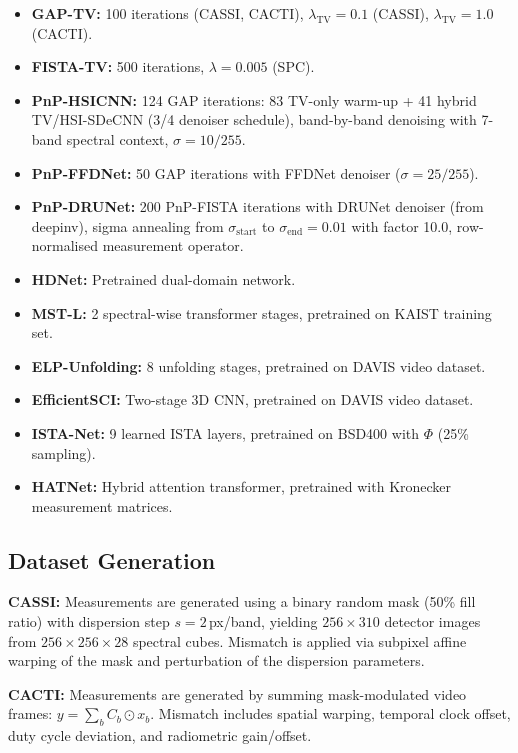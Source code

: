 \documentclass[runningheads]{llncs}
\begin{document}
\begin{itemize}
    \item \textbf{GAP-TV:} 100 iterations (CASSI, CACTI), $\lambda_{\text{TV}} = 0.1$ (CASSI), $\lambda_{\text{TV}} = 1.0$ (CACTI).
    \item \textbf{FISTA-TV:} 500 iterations, $\lambda = 0.005$ (SPC).
    \item \textbf{PnP-HSICNN:} 124 GAP iterations: 83 TV-only warm-up + 41 hybrid TV/HSI-SDeCNN (3/4 denoiser schedule), band-by-band denoising with 7-band spectral context, $\sigma = 10/255$.
    \item \textbf{PnP-FFDNet:} 50 GAP iterations with FFDNet denoiser ($\sigma = 25/255$).
    \item \textbf{PnP-DRUNet:} 200 PnP-FISTA iterations with DRUNet denoiser (from deepinv), sigma annealing from $\sigma_{\text{start}}$ to $\sigma_{\text{end}}{=}0.01$ with factor 10.0, row-normalised measurement operator.
    \item \textbf{HDNet:} Pretrained dual-domain network.
    \item \textbf{MST-L:} 2 spectral-wise transformer stages, pretrained on KAIST training set.
    \item \textbf{ELP-Unfolding:} 8 unfolding stages, pretrained on DAVIS video dataset.
    \item \textbf{EfficientSCI:} Two-stage 3D CNN, pretrained on DAVIS video dataset.
    \item \textbf{ISTA-Net:} 9 learned ISTA layers, pretrained on BSD400 with $\Phi$ (25\% sampling).
    \item \textbf{HATNet:} Hybrid attention transformer, pretrained with Kronecker measurement matrices.
\end{itemize}

\subsection{Dataset Generation}

\textbf{CASSI:} Measurements are generated using a binary random mask (50\% fill ratio) with dispersion step $s = 2$\,px/band, yielding $256 \times 310$ detector images from $256 \times 256 \times 28$ spectral cubes. Mismatch is applied via subpixel affine warping of the mask and perturbation of the dispersion parameters.

\textbf{CACTI:} Measurements are generated by summing mask-modulated video frames: $y = \sum_{b} C_b \odot x_b$. Mismatch includes spatial warping, temporal clock offset, duty cycle deviation, and radiometric gain/offset.
\end{document}
